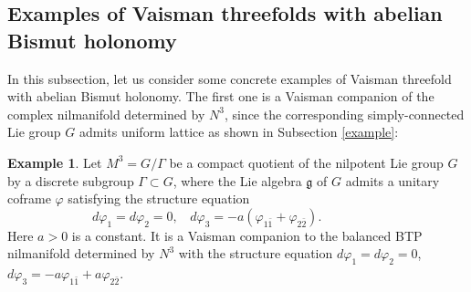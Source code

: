 \documentclass{amsart}
\numberwithin{equation}{section}
\theoremstyle{definition}
\newtheorem{example}  [theorem]     {Example}
\renewcommand{\1}{\mathds{1}}
\renewcommand{\>}{\rightarrow}
\begin{document}
\subsection{Examples of Vaisman threefolds with abelian Bismut holonomy}\label{Hopf}
In this subsection, let us consider some concrete examples of Vaisman threefold with abelian Bismut holonomy.
The first one is a Vaisman companion of the complex nilmanifold determined by $N^3$, since
the corresponding simply-connected Lie group $G$ admits uniform lattice as shown in Subsection \ref{example}:

\begin{example}
Let $M^3=G/\Gamma $ be a compact quotient of the nilpotent Lie group $G$ by a discrete subgroup $\Gamma \subset G$, where the Lie algebra ${\mathfrak g}$ of $G$ admits a unitary coframe $\varphi$ satisfying the structure equation
$$ d\varphi_1=d\varphi_2=0,\ \ \ \ d\varphi_3= -a (\varphi_{1\bar{1}}+ \varphi_{2\bar{2}}). \hspace{2cm} $$
Here $a>0$ is a constant. It is a Vaisman companion to the balanced BTP nilmanifold determined by $N^3$
with the structure equation $d\varphi_1=d\varphi_2=0$,  $d\varphi_3= -a \varphi_{1\bar{1}}+ a\varphi_{2\bar{2}}$.
\end{example}
\end{document}
